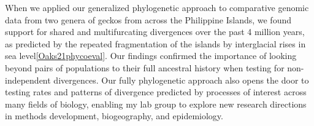 When we applied our generalized phylogenetic approach to comparative genomic data
from two genera of geckos from across the Philippine Islands, we found support
for shared and multifurcating divergences over the past 4 million years,
as predicted by the repeated fragmentation of the islands by interglacial rises
in sea
level\cref{Oaks21phycoeval}.
Our findings confirmed the importance of looking beyond pairs of populations to
their full ancestral history when testing for non-independent divergences.
Our fully phylogenetic approach also opens the door to testing rates and
patterns of divergence predicted by processes of interest across many fields of
biology,
enabling my lab group to explore new research directions in methods
development, biogeography, and epidemiology.


